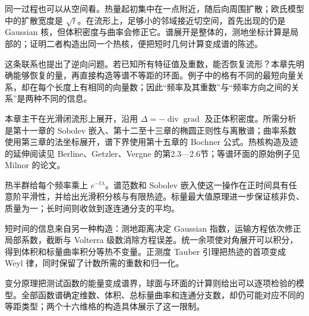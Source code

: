 \ProseParagraphBreak

同一过程也可以从空间看。热量起初集中在一点附近，随后向周围扩散；欧氏模型中的扩散宽度是 \(\sqrt t\)。在流形上，足够小的邻域接近切空间，首先出现的仍是 Gaussian 核，但体积密度与曲率会修正它。谱展开是整体的，测地坐标计算是局部的；证明二者构造出同一个热核，便把短时几何计算变成谱的陈述。

\ProseParagraphBreak

这条联系也提出了逆向问题。若已知所有特征值及重数，能否恢复流形？本章先明确能够恢复的量，再直接构造等谱不等距的环面。例子中的格有不同的最短向量关系，却在每个长度上有相同的向量数；因此“频率及其重数”与“频率方向之间的关系”是两种不同的信息。

\ProseParagraphBreak

本章主干在光滑闭流形上展开，沿用 \(\Delta=-\operatorname{div}\operatorname{grad}\) 及正体积密度。所需分析是第十一章的 Sobolev 嵌入、第十二至十三章的椭圆正则性与离散谱；曲率系数使用第三章的法坐标展开，谱下界使用第十五章的 Bochner 公式。热核构造及迹的延伸阅读见 Berline、Getzler、Vergne 的第2.3—2.6节\cite[第2章，2.3--2.6节]{BerlineGetzlerVergne2004}；等谱环面的原始例子见 Milnor 的论文\cite[第542页]{Milnor1964Isospectral}。






\begin{chaptersummary}
	热半群给每个频率乘上 \(e^{-t\lambda}\)。谱范数和 Sobolev 嵌入使这一操作在正时间具有任意阶平滑性，并给出光滑积分核与有限热迹。标量最大值原理进一步保证核非负、质量为一；长时间则收敛到逐连通分支的平均。

	\ProseParagraphBreak

	短时间的信息来自另一种构造：测地距离决定 Gaussian 指数，运输方程依次修正局部系数，截断与 Volterra 级数消除方程误差。统一余项使对角展开可以积分，得到体积和标量曲率积分等热不变量。正测度 Tauber 引理把热迹的首项变成 Weyl 律，同时保留了计数所需的重数和归一化。

	\ProseParagraphBreak

	变分原理把测试函数的能量变成谱界，球面与环面的计算则给出可以逐项检验的模型。全部函数谱确定维数、体积、总标量曲率和连通分支数，却仍可能对应不同的等距类型；两个十六维格的构造具体展示了这一限制。
\end{chaptersummary}

\BookExercises

